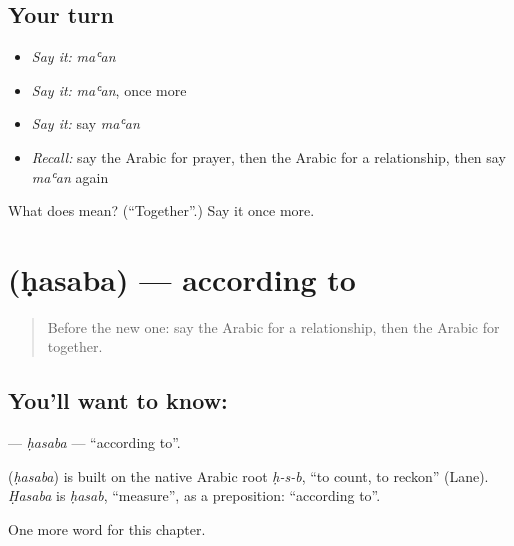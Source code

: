 \subsection*{Your turn}
\begin{itemize}
\raggedright
  \item \emph{Say it:} \emph{maʿan}
  \item \emph{Say it:} \emph{maʿan}, once more
  \item \emph{Say it:} say \emph{maʿan}
  \item \emph{Recall:} say the Arabic for prayer, then the Arabic for a relationship, then say \emph{maʿan} again
\end{itemize}

\begin{tcolorbox}[breakable,colback=teal!4,colframe=teal!35!black,title={Before you move on}]
What does  mean? (\textquotedblleft{}Together\textquotedblright{}.) Say it once more.
\end{tcolorbox}
\section[\texorpdfstring{\ar{حسب} (ḥasaba)}{حسب (ḥasaba)}]{ (ḥasaba) — according to}

\label{lesson:AR-C268-hasaba}



\begin{quote}
Before the new one: say the Arabic for a relationship, then the Arabic for together.
\end{quote}

\subsection*{You'll want to know: }
\textbf{} — \emph{ḥasaba} — \textquotedblleft{}according to\textquotedblright{}.

\begin{cousinweb}
\textbf{} (\emph{ḥasaba}) is built on the native Arabic root \emph{ḥ-s-b}, \textquotedblleft{}to count, to reckon\textquotedblright{} (Lane). \emph{Ḥasaba} is \emph{ḥasab}, \textquotedblleft{}measure\textquotedblright{}, as a preposition: \textquotedblleft{}according to\textquotedblright{}.
\end{cousinweb}

\begin{grammarlens}[title={What you've built}]
One more word for this chapter.
\end{grammarlens}

